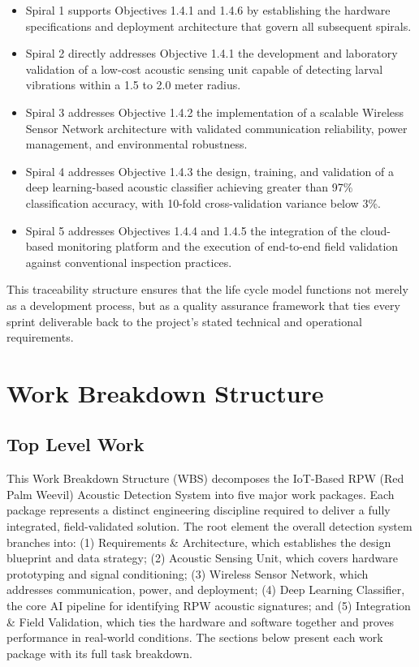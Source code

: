 \documentclass[12pt,a4paper,oneside]{memoir}
\begin{document}
\begin{itemize}
    \item Spiral 1 supports Objectives 1.4.1 and 1.4.6 by establishing the hardware
    specifications and deployment architecture that govern all subsequent spirals.

    \item Spiral 2 directly addresses Objective 1.4.1 the development and laboratory
    validation of a low-cost acoustic sensing unit capable of detecting larval vibrations within
    a 1.5 to 2.0 meter radius.

    \item Spiral 3 addresses Objective 1.4.2 the implementation of a scalable Wireless Sensor
    Network architecture with validated communication reliability, power management, and
    environmental robustness.

    \item Spiral 4 addresses Objective 1.4.3 the design, training, and validation of a deep
    learning-based acoustic classifier achieving greater than 97\% classification accuracy,
    with 10-fold cross-validation variance below 3\%.

    \item Spiral 5 addresses Objectives 1.4.4 and 1.4.5 the integration of the cloud-based
    monitoring platform and the execution of end-to-end field validation against conventional
    inspection practices.
\end{itemize}

This traceability structure ensures that the life cycle model functions not merely as a development process, but as a quality assurance framework that ties every sprint deliverable back to the project's stated technical and operational requirements.

\section{Work Breakdown Structure}
\label{sec:WBS}

\subsection{Top Level Work}

This Work Breakdown Structure (WBS) decomposes the IoT-Based RPW (Red Palm Weevil) Acoustic Detection System into five major work packages. Each package represents a distinct engineering discipline required to deliver a fully integrated, field-validated solution. The root element the overall detection system branches into: (1) Requirements \& Architecture, which establishes the design blueprint and data strategy; (2) Acoustic Sensing Unit, which covers hardware prototyping and signal conditioning; (3) Wireless Sensor Network, which addresses communication, power, and deployment; (4) Deep Learning Classifier, the core AI pipeline for identifying RPW acoustic signatures; and (5) Integration \& Field Validation, which ties the hardware and software together and proves performance in real-world conditions. The sections below present each work package with its full task breakdown.
\end{document}
